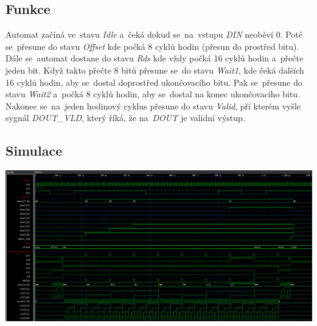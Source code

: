 \documentclass{article}
\begin{document}
\subsection{Funkce}
Automat začíná ve~stavu \emph{Idle} a~čeká dokud se~na~vstupu \emph{DIN}
neoběví 0. Poté se~přesune do stavu \emph{Offset} kde počká 8 cyklů hodin
(přesun do prostřed bitu). Dále se~automat dostane do stavu \emph{Rds} kde vždy
počká 16 cyklů hodin a~přečte jeden bit. Když takto přečte 8 bitů přesune se~do
stavu \emph{Wait1}, kde čeká dalších 16 cyklů hodin, aby se~dostal doprostřed
ukončovacího bitu. Pak se~přesune do stavu \emph{Wait2} a~počká 8 cyklů hodin,
aby se~dostal na konec ukončovacího bitu. Nakonec se~na~jeden hodinový cyklus
přesune do stavu \emph{Valid}, při kterém vyšle sygnál \emph{DOUT\_VLD}, který
říká, že na~\emph{DOUT} je validní výstup.

\begin{landscape}
    \section{Simulace}
    \includegraphics*[scale=0.5751]{assets/simulation.png}
\end{landscape}
\end{document}
